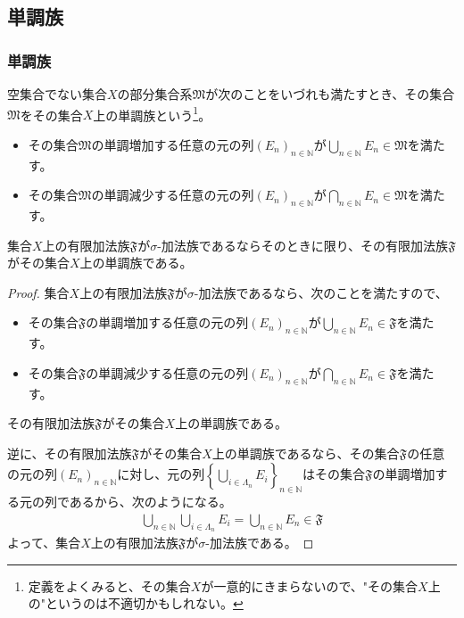 \documentclass[dvipdfmx]{jsarticle}
\begin{document}
\subsection{単調族}%
\subsubsection{単調族}%
\begin{axs}[単調族の公理]
空集合でない集合$X$の部分集合系$\mathfrak{M}$が次のことをいづれも満たすとき、その集合$\mathfrak{M}$をその集合$X$上の単調族という\footnote{定義をよくみると、その集合$X$が一意的にきまらないので、"その集合$X$上の"というのは不適切かもしれない。}。
\begin{itemize}
\item
  その集合$\mathfrak{M}$の単調増加する任意の元の列$\left( E_{n} \right)_{n \in \mathbb{N}}$が$\bigcup_{n \in \mathbb{N}} E_{n}\in \mathfrak{M}$を満たす。
\item
  その集合$\mathfrak{M}$の単調減少する任意の元の列$\left( E_{n} \right)_{n \in \mathbb{N}}$が$\bigcap_{n \in \mathbb{N}} E_{n}\in \mathfrak{M}$を満たす。
\end{itemize}
\end{axs}
\begin{thm}\label{4.5.6.1}
集合$X$上の有限加法族$\mathfrak{F}$が$\sigma$-加法族であるならそのときに限り、その有限加法族$\mathfrak{F}$がその集合$X$上の単調族である。
\end{thm}
\begin{proof}
集合$X$上の有限加法族$\mathfrak{F}$が$\sigma$-加法族であるなら、次のことを満たすので、
\begin{itemize}
\item
  その集合$\mathfrak{F}$の単調増加する任意の元の列$\left( E_{n} \right)_{n \in \mathbb{N}}$が$\bigcup_{n \in \mathbb{N}} E_{n}\in \mathfrak{F}$を満たす。
\item
  その集合$\mathfrak{F}$の単調減少する任意の元の列$\left( E_{n} \right)_{n \in \mathbb{N}}$が$\bigcap_{n \in \mathbb{N}} E_{n}\in \mathfrak{F}$を満たす。
\end{itemize}
その有限加法族$\mathfrak{F}$がその集合$X$上の単調族である。\par
逆に、その有限加法族$\mathfrak{F}$がその集合$X$上の単調族であるなら、その集合$\mathfrak{F}$の任意の元の列$\left( E_{n} \right)_{n \in \mathbb{N}}$に対し、元の列$\left\{ \bigcup_{i \in \varLambda_{n}} E_{i} \right\}_{n \in \mathbb{N}}$はその集合$\mathfrak{F}$の単調増加する元の列であるから、次のようになる。
\begin{align*}
\bigcup_{n \in \mathbb{N}} {\bigcup_{i \in \varLambda_{n}} E_{i}} = \bigcup_{n \in \mathbb{N}} E_{n}\in \mathfrak{F}
\end{align*}
よって、集合$X$上の有限加法族$\mathfrak{F}$が$\sigma$-加法族である。
\end{proof}
\end{document}
